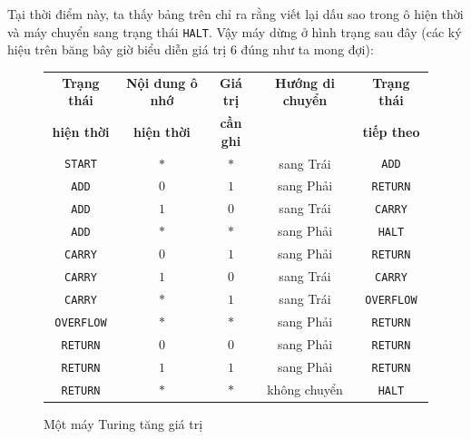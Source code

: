 Tại thời điểm này, ta thấy bảng trên chỉ ra rằng viết lại dấu sao trong ô hiện thời và máy
chuyển sang trạng thái \texttt{HALT}. Vậy máy dừng ở hình trạng sau đây (các ký hiệu trên
băng bây giờ biểu diễn giá trị $6$ đúng như ta mong đợi):
\begin{center}
\end{center}


\begin{figure}
  \label{fig:fig113}  
  \centering
  \begin{tabular}{ccccc} \hline
    \textbf{Trạng thái} & \textbf{Nội dung ô nhớ} & \textbf{Giá trị} & \textbf{Hướng di chuyển} & \textbf{Trạng thái} \\
    \textbf{hiện thời}  & \textbf{hiện thời}      & \textbf{cần ghi} &                          & \textbf{tiếp theo}  \\
    \hline
    \texttt{START}      & $*$                     & $*$              & sang Trái                & \texttt{ADD}        \\
    \texttt{ADD}        & $0$                     & $1$              & sang Phải                & \texttt{RETURN}     \\
    \texttt{ADD}        & $1$                     & $0$              & sang Trái                & \texttt{CARRY}      \\
    \texttt{ADD}        & $*$                     & $*$              & sang Phải                & \texttt{HALT}       \\
    \texttt{CARRY}      & $0$                     & $1$              & sang Phải                & \texttt{RETURN}     \\
    \texttt{CARRY}      & $1$                     & $0$              & sang Trái                & \texttt{CARRY}      \\
    \texttt{CARRY}      & $*$                     & $1$              & sang Trái                & \texttt{OVERFLOW}   \\
    \texttt{OVERFLOW}   & $*$                     & $*$              & sang Phải                & \texttt{RETURN}     \\
    \texttt{RETURN}     & $0$                     & $0$              & sang Phải                & \texttt{RETURN}     \\
    \texttt{RETURN}     & $1$                     & $1$              & sang Phải                & \texttt{RETURN}     \\
    \texttt{RETURN}     & $*$                     & $*$              & không chuyển             & \texttt{HALT}       \\
    \hline
  \end{tabular}
  \caption{Một máy Turing tăng giá trị}
\end{figure}

